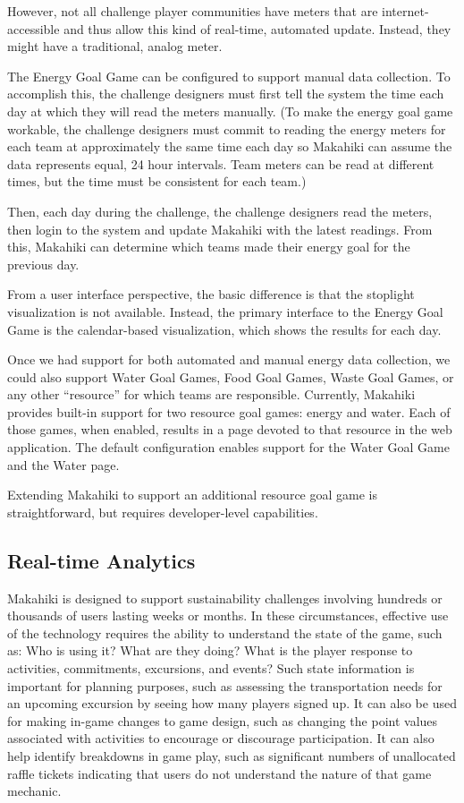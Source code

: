However, not all challenge player communities have meters that are internet-accessible and thus allow this kind of real-time, automated update. Instead, they might have a traditional, analog meter.

The Energy Goal Game can be configured to support manual data collection. To accomplish this, the challenge designers must first tell the system the time each day at which they will read the meters manually. (To make the energy goal game workable, the challenge designers must commit to reading the energy meters for each team at approximately the same time each day so Makahiki can assume the data represents equal, 24 hour intervals. Team meters can be read at different times, but the time must be consistent for each team.)

Then, each day during the challenge, the challenge designers read the meters, then login to the system and update Makahiki with the latest readings. From this, Makahiki can determine which teams made their energy goal for the previous day.

From a user interface perspective, the basic difference is that the stoplight visualization is not available. Instead, the primary interface to the Energy Goal Game is the calendar-based visualization, which shows the results for each day.

Once we had support for both automated and manual energy data collection,  we could also support Water Goal Games, Food Goal Games, Waste Goal Games, or any other ``resource'' for which teams are responsible. Currently, Makahiki provides built-in support for two resource goal games: energy and water. Each of those games, when enabled, results in a page devoted to that resource in the web application. The default configuration enables support for the Water Goal Game and the Water page.

Extending Makahiki to support an additional resource goal game is straightforward, but requires developer-level capabilities.

\subsection{Real-time Analytics}

Makahiki is designed to support sustainability challenges involving hundreds or thousands of users lasting weeks or months.  In these circumstances, effective use of the technology requires the ability to understand the state of the game, such as: Who is using it? What are they doing? What is the player response to activities, commitments, excursions, and events?   Such state information is important for planning purposes, such as assessing the transportation needs for an upcoming excursion by seeing how many players signed up.   It can also be used for making in-game changes to game design, such as changing the point values associated with activities to encourage or discourage participation.  It can also help identify breakdowns in game play, such as significant numbers of unallocated raffle tickets indicating that users do not understand the nature of that game mechanic.

